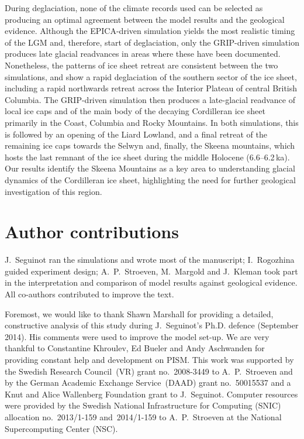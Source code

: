 \documentclass[tc]{copernicus}
\begin{document}
During deglaciation, none of the climate records used can be selected as
producing an optimal agreement between the model results and the geological
evidence. Although the EPICA-driven simulation yields the most realistic timing
of the LGM and, therefore, start of deglaciation, only the GRIP-driven
simulation produces late glacial readvances in areas where these have been
documented. Nonetheless, the patterns of ice sheet retreat are consistent
between the two simulations, and show a rapid deglaciation of the southern
sector of the ice sheet, including a rapid northwards retreat across the Interior
Plateau of central British Columbia. The GRIP-driven simulation then produces a
late-glacial readvance of local ice caps and of the main body of the decaying
Cordilleran ice sheet primarily in the Coast, Columbia and Rocky Mountains.
In both simulations, this is followed by an
opening of the Liard Lowland, and a final retreat of the remaining ice caps
towards the Selwyn and, finally, the Skeena mountains, which hosts the last
remnant of the ice sheet during the middle Holocene (6.6--6.2\,ka). Our results
identify the Skeena Mountains as a key area to understanding glacial dynamics
of the Cordilleran ice sheet, highlighting the need for further geological
investigation of this region.

\section*{Author contributions}
J.~Seguinot ran the simulations and wrote most of the manuscript; I.~Rogozhina
guided experiment design; A.~P.~Stroeven, M.~Margold and J.~Kleman took part in
the interpretation and comparison of model results against geological evidence.
All co-authors contributed to improve the text.

\begin{acknowledgements}
Foremost, we would like to thank Shawn Marshall for providing a detailed,
constructive analysis of this study during J.~Seguinot's Ph.D. defence
(September 2014). His comments were used to improve the model set-up.
We are very thankful to Constantine Khroulev, Ed Bueler and Andy Aschwanden for
providing constant help and development on PISM. This work was supported by the
Swedish Research Council~(VR) grant no.~2008-3449 to A.~P.~Stroeven and by the
German Academic Exchange Service~(DAAD) grant no.~50015537 and a Knut and Alice
Wallenberg Foundation grant to J.~Seguinot. Computer resources were provided
by the Swedish National Infrastructure for Computing (SNIC) allocation
no.~2013/1-159 and~2014/1-159 to A.~P.~Stroeven at the National Supercomputing
Center (NSC).
\end{acknowledgements}



\newpage

\end{document}
